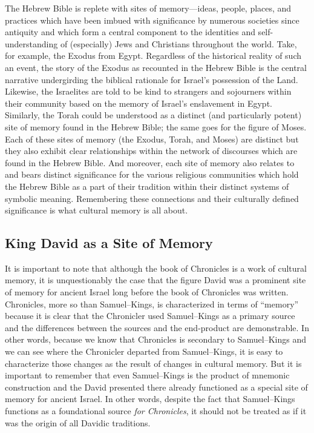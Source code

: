 The Hebrew Bible is replete with sites of memory---ideas, people, places, and practices which have been imbued with significance by numerous societies since antiquity and which form a central component to the identities and self-understanding of (especially) Jews and Christians throughout the world. Take, for example, the Exodus from Egypt. Regardless of the historical reality of such an event, the story of the Exodus as recounted in the Hebrew Bible is the central narrative undergirding the biblical rationale for Israel's possession of the Land. Likewise, the Israelites are told to be kind to strangers and sojourners within their community based on the memory of Israel's enslavement in Egypt. Similarly, the Torah could be understood as a distinct (and particularly potent) site of memory found in the Hebrew Bible; the same goes for the figure of Moses. Each of these sites of memory (the Exodus, Torah, and Moses) are distinct but they also exhibit clear relationships within the network of discourses which are found in the Hebrew Bible. And moreover, each site of memory also relates to and bears distinct significance for the various religious communities which hold the Hebrew Bible as a part of their tradition within their distinct systems of symbolic meaning. Remembering these connections and their culturally defined significance is what cultural memory is all about.

\subsection{King David as a Site of Memory}

It is important to note that although the book of Chronicles is a work of cultural memory, it is unquestionably the case that the figure David was a prominent site of memory for ancient Israel long before the book of Chronicles was written. Chronicles, more so than Samuel--Kings, is characterized in terms of ``memory'' because it is clear that the Chronicler used Samuel--Kings as a primary source and the differences between the sources and the end-product are demonstrable. In other words, because we know that Chronicles is secondary to Samuel--Kings and we can see where the Chronicler departed from Samuel--Kings, it is easy to characterize those changes as the result of changes in cultural memory. But it is important to remember that even Samuel--Kings is the product of mnemonic construction and the David presented there already functioned as a special site of memory for ancient Israel. In other words, despite the fact that Samuel--Kings functions as a foundational source \emph{for Chronicles}, it should not be treated as if it was the origin of all Davidic traditions.

